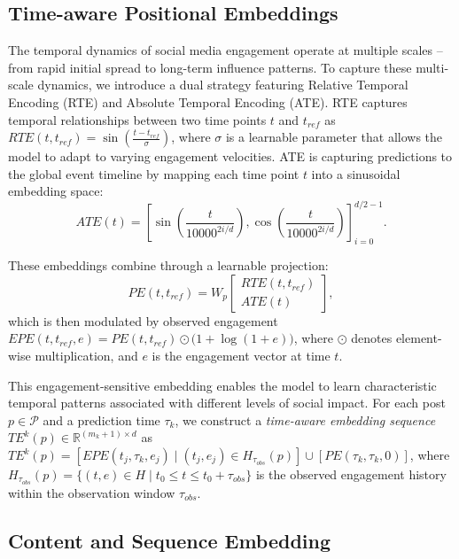 \subsection{Time-aware Positional Embeddings}
\label{subsec:time-aware-embed}

The temporal dynamics of social media engagement operate at multiple scales -- from rapid initial spread to long-term influence patterns. 
To capture these multi-scale dynamics, we introduce a dual strategy featuring Relative Temporal Encoding (RTE) and Absolute Temporal Encoding (ATE).
RTE captures temporal relationships between two time points $t$ and $t_{ref}$ as
$RTE(t, t_{ref}) = \sin\left(\frac{t - t_{ref}}{\sigma}\right)$, where $\sigma$ is a learnable parameter that allows the model to adapt to varying engagement velocities.
ATE is capturing predictions to the global event timeline by mapping each time point $t$ into a sinusoidal embedding space:
\begin{equation*}
ATE(t) = \left[\sin\left(\frac{t}{10000^{2i/d}}\right), \cos\left(\frac{t}{10000^{2i/d}}\right)\right]_{i=0}^{d/2-1}.
\end{equation*}

These embeddings combine through a learnable projection:
\begin{equation*}
PE(t, t_{ref}) = W_p \begin{bmatrix} RTE(t, t_{ref}) \\ ATE(t) \end{bmatrix},
\end{equation*}
which is then modulated by observed engagement
$EPE(t, t_{ref}, e) = PE(t, t_{ref}) \odot \bigl(1 + \log\left(1 + e\right)\bigl)$,
 where $\odot$ denotes element-wise multiplication, and $e$ is the engagement vector at time $t$.

This engagement-sensitive embedding enables the model to learn characteristic temporal patterns associated with different levels of social impact.
For each post $p \in \mathcal{P}$ and a prediction time $\tau_k$, we construct a \textit{time-aware embedding sequence} $TE^k(p) \in \mathbb{R}^{(m_k + 1) \times d}$ as $
TE^k(p) = \left[EPE(t_{j}, \tau_k, e_{j}) \mid (t_j, e_j) \in H_{\tau_{obs}}(p)\right] \cup \left[PE(\tau_k, \tau_k, 0)\right]$, where $H_{\tau_{obs}}(p) = \{(t, e) \in H \mid t_0 \leq t \leq t_0 + \tau_{obs}\}$ is the observed engagement history within the observation window $\tau_{obs}$.

\subsection{Content and Sequence Embedding}
\label{subsec:context-sequence-embed}

